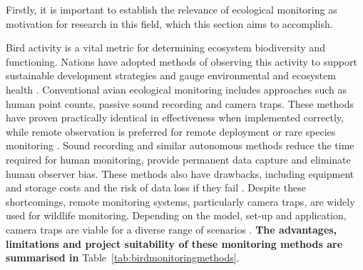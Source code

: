
Firstly, it is important to establish the relevance of ecological monitoring as motivation for research in this field, which this section aims to accomplish.
\par\vspace{6pt}
Bird activity is a vital metric for determining ecosystem biodiversity and functioning. Nations have adopted methods of observing this activity to support sustainable development strategies and gauge environmental and ecosystem health \cite{GregoryVanStrien2010}. Conventional avian ecological monitoring includes approaches such as human point counts, passive sound recording and camera traps. These methods have proven practically identical in effectiveness when implemented correctly, while remote observation is preferred for remote deployment or rare species monitoring \cite{DarrasEtAl2018}. Sound recording and similar autonomous methods reduce the time required for human monitoring, provide permanent data capture and eliminate human observer bias. These methods also have drawbacks, including equipment and storage costs and the risk of data loss if they fail \cite{ShonfieldBayne2017}. Despite these shortcomings, remote monitoring systems, particularly camera traps, are widely used for wildlife monitoring. Depending on the model, set-up and application, camera traps are viable for a diverse range of scenarios \cite{TrollietEtAl2014}. \textbf{The advantages, limitations and project suitability of these monitoring methods are summarised in} Table~\ref{tab:birdmonitoringmethods}.


